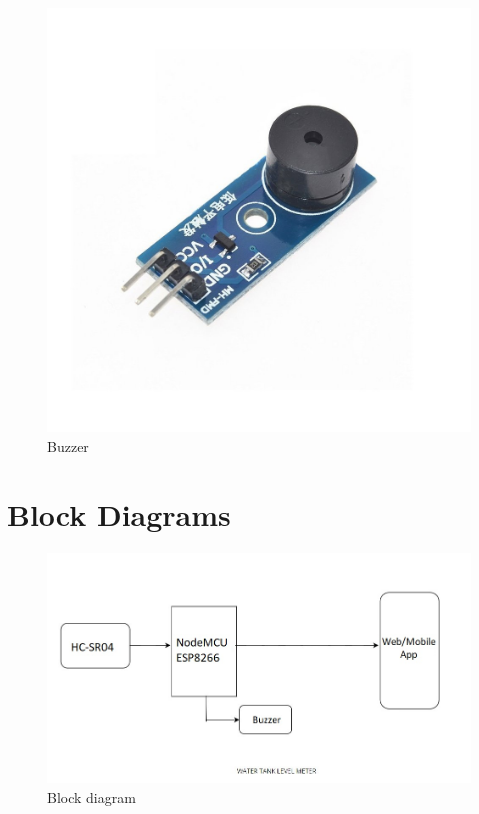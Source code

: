 \documentclass[12pt]{article}
\begin{document}
\begin{itemize}
 \begin{figure}[H]
\centering
    \includegraphics[scale=0.18]{buzzer.jpg}
    \caption{Buzzer}
    \label{fig:my_label}
\end{figure}
  \end{itemize}
\section*{Block Diagrams}
\normalsize
 \begin{figure}[H]
\centering
    \includegraphics[scale=0.75]{bdiagram.jpg}
    \caption{Block diagram}
    \label{fig:my_label}
\end{figure}
\clearpage
\end{document}
